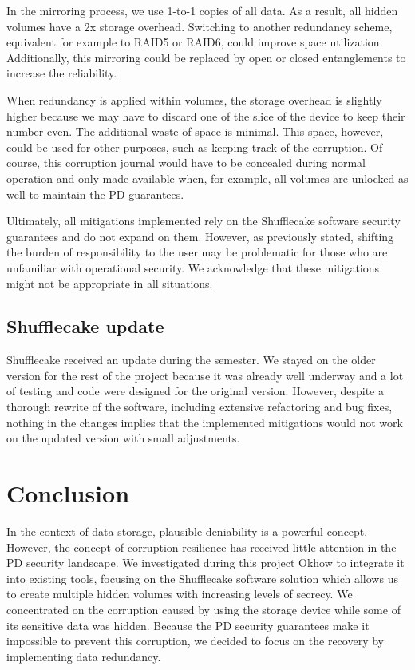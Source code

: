 \documentclass[a4paper,11pt,oneside]{report}
\begin{document}
In the mirroring process, we use 1-to-1 copies of all data. As a result, all hidden volumes have a 2x storage overhead. Switching to another redundancy scheme, equivalent for example to RAID5 or RAID6, could improve space utilization. Additionally, this mirroring could be replaced by open or closed entanglements to increase the reliability\cite{entanglements}.

When redundancy is applied within volumes, the storage overhead is slightly higher because we may have to discard one of the slice of the device to keep their number even. The additional waste of space is minimal. This space, however, could be used for other purposes, such as keeping track of the corruption. Of course, this corruption journal would have to be concealed during normal operation and only made available when, for example, all volumes are unlocked as well to maintain the PD guarantees.

Ultimately, all mitigations implemented rely on the Shufflecake software security guarantees and do not expand on them. However, as previously stated, shifting the burden of responsibility to the user may be problematic for those who are unfamiliar with operational security. We acknowledge that these mitigations might not be appropriate in all situations.

\section{Shufflecake update}

Shufflecake received an update during the semester. We stayed on the older version for the rest of the project because it was already well underway and a lot of testing and code were designed for the original version. However, despite a thorough rewrite of the software, including extensive refactoring and bug fixes, nothing in the changes implies that the implemented mitigations would not work on the updated version with small adjustments.

\let\clearpage\relax

\chapter{Conclusion}

In the context of data storage, plausible deniability is a powerful concept. However, the concept of corruption resilience has received little attention in the PD security landscape. We investigated during this project Okhow to integrate it into existing tools, focusing on the Shufflecake software solution which allows us to create multiple hidden volumes with increasing levels of secrecy. We concentrated on the corruption caused by using the storage device while some of its sensitive data was hidden. Because the PD security guarantees make it impossible to prevent this corruption, we decided to focus on the recovery by implementing data redundancy.
\end{document}
